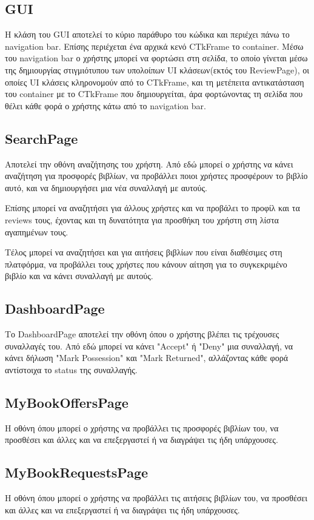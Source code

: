\documentclass[12pt,a4paper]{article}
\begin{document}
\subsection{GUI}
Η κλάση του GUI αποτελεί το κύριο παράθυρο του κώδικα και περιέχει πάνω το navigation bar. Επίσης περιέχεται ένα αρχικά κενό CTkFrame το container. Μέσω του navigation bar ο χρήστης μπορεί να φορτώσει στη σελίδα, το οποίο γίνεται μέσω της δημιουργίας στιγμιότυπου των υπολοίπων UI κλάσεων(εκτός του ReviewPage), οι οποίες UI κλάσεις κληρονομούν από το CTkFrame, και τη μετέπειτα αντικατάσταση του container με το CTkFrame που δημιουργείται, άρα φορτώνοντας τη σελίδα που θέλει κάθε φορά ο χρήστης κάτω από το navigation bar.

\subsection{SearchPage}
Αποτελεί την οθόνη αναζήτησης του χρήστη. Από εδώ μπορεί ο χρήστης να κάνει αναζήτηση για προσφορές βιβλίων, να προβάλλει ποιοι χρήστες προσφέρουν το βιβλίο αυτό, και να δημιουργήσει μια νέα συναλλαγή με αυτούς.

Επίσης μπορεί να αναζητήσει για άλλους χρήστες και να προβάλει το προφίλ και τα reviews τους, έχοντας και τη δυνατότητα για προσθήκη του χρήστη στη λίστα αγαπημένων τους.

Τέλος μπορεί να αναζητήσει και για αιτήσεις βιβλίων που είναι διαθέσιμες στη πλατφόρμα, να προβάλλει τους χρήστες που κάνουν αίτηση για το συγκεκριμένο βιβλίο και να κάνει συναλλαγή με αυτούς.

\subsection{DashboardPage}
Το DashboardPage αποτελεί την οθόνη όπου ο χρήστης βλέπει τις τρέχουσες συναλλαγές του. Από εδώ μπορεί να κάνει "Accept" ή "Deny" μια συναλλαγή, να κάνει δήλωση "Mark Possession" και "Mark Returned", αλλάζοντας κάθε φορά αντίστοιχα το status της συναλλαγής.

\subsection{MyBookOffersPage}
Η οθόνη όπου μπορεί ο χρήστης να προβάλλει τις προσφορές βιβλίων του, να προσθέσει και άλλες και να επεξεργαστεί ή να διαγράψει τις ήδη υπάρχουσες.

\subsection{MyBookRequestsPage}
Η οθόνη όπου μπορεί ο χρήστης να προβάλλει τις αιτήσεις βιβλίων του, να προσθέσει και άλλες και να επεξεργαστεί ή να διαγράψει τις ήδη υπάρχουσες.
\end{document}
